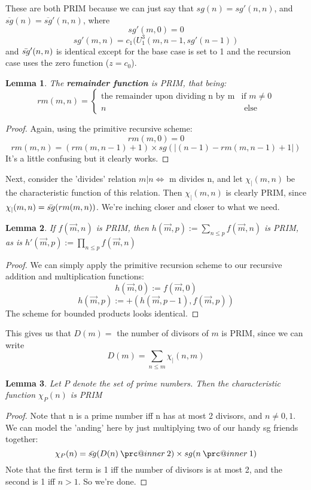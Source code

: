 \documentclass{article}
\makeatletter
\newcommand{\prc}{\mathbin{\mathpalette\prc@inner\relax}}
\newcommand{\prc@inner}[2]{%
  \vbox{\offinterlineskip\m@th
    \ialign{%
      ##\cr
      \hidewidth\raisebox{-1.5\height}[0pt][0pt]{$#1.$}\hidewidth\cr
      $#1-$\cr
    }%
  }%
}
\theoremstyle{definition}
\theoremstyle{plain}
\theoremstyle{theorem}
\newtheorem{lemma}{Lemma}[section]
\makeatother
\begin{document}
These are both PRIM because we can just say that $sg(n) = sg'(n,n)$, and $\overline{sg}(n) = \overline{sg}'(n,n)$, where
\[ sg'(m,0) = 0 \]
\[ sg'(m,n) = c_1(U_1^3(m,n-1,sg'(n-1)) \]
and $\Bar{sg}'(n,n)$ is identical except for the base case is set to 1 and the recursion case uses the zero function ($z=c_0$).
\begin{lemma}
    The \textbf{remainder function} is PRIM, that being: \[ rm(m,n) = \begin{cases} 
                                                    \textrm{the remainder upon dividing n by m} & \textrm{if $m \neq 0$} \\
                                                    n  & \textrm{ else}
                                        \end{cases} \]
\end{lemma}
\begin{proof}
    Again, using the primitive recursive scheme:
        \[rm(m,0) = 0 \]
        \[rm(m,n) = (rm(m,n-1)+1)\times sg(|(n-1)-rm(m,n-1)+1|) \]
    It's a little confusing but it clearly works. 
\end{proof}
Next, consider the 'divides' relation $m|n \iff$ m divides n, and let $\chi_|(m,n)$ be the characteristic function of this relation. Then $\chi_|(m,n)$ is clearly PRIM, since $\chi_|(m,n) = \Bar{sg}(rm(m,n))$. We're inching closer and closer to what we need.
\begin{lemma}
    If $f(\vec{m},n)$ is PRIM, then $h(\vec{m},p) := \underset{n \leq p}{\sum}f(\vec{m},n)$ is PRIM, as is $h'(\vec{m},p):= \underset{n \leq p}{\prod}f(\vec{m},n)$
\end{lemma}
\begin{proof}
    We can simply apply the primitive recursion scheme to our recursive addition and multiplication functions:
    \[h(\vec{m},0) := f(\vec{m},0) \]
    \[h(\vec{m},p) := +(h(\vec{m},p-1),f(\vec{m},p)) \]
    The scheme for bounded products looks identical.
\end{proof}
This gives us that $D(m) = $ the number of divisors of $m$ is PRIM, since we can write 
\[D(m) = \sum_{n \leq m}\chi_|(n,m) \]
\begin{lemma}
    Let $P$ denote the set of prime numbers. Then the characteristic function $\chi_P(n)$ is PRIM
\end{lemma}
\begin{proof}
    Note that n is a prime number iff n has at most 2 divisors, and $n \neq 0,1$. We can model the 'anding' here by just multiplying two of our handy sg friends together:
    \[\chi_P(n) = \Bar{sg}(D(n) \prc 2)\times sg(n \prc 1) \]
    Note that the first term is 1 iff the number of divisors is at most 2, and the second is 1 iff $n > 1$. So we're done.  
\end{proof}
\end{document}
